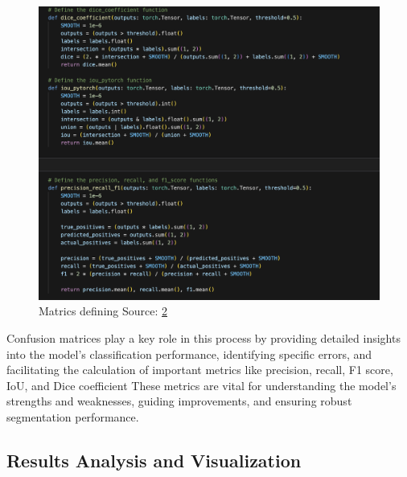 \documentclass[11pt,a4paper]{article}
\begin{document}
\begin{figure}[H]
    \centering
    \includegraphics[width= 0.82\linewidth]{martics.png}
    
    \caption{Matrics defining \newline  \space Source: \href{https://www.kaggle.com/code/arham23/brain-mri-segmentation-eda-and-unet-unet-results/notebook}{2}}
    
\end{figure}

Confusion matrices play a key role in this process by providing detailed insights into the model's classification performance, identifying specific errors, and facilitating the calculation of important metrics like precision, recall, F1 score, IoU, and Dice coefficient
\vspace{0.2cm}
\linebreak
These metrics are vital for understanding the model's strengths and weaknesses, guiding improvements, and ensuring robust segmentation performance.
\vspace{0.9cm}
\subsection{Results Analysis and Visualization}
\end{document}
